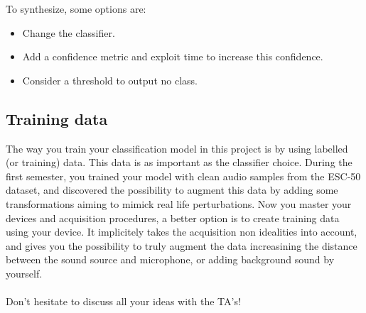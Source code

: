 To synthesize, some options are:
\begin{itemize}
    \item Change the classifier.
    \item Add a confidence metric and exploit time to increase this confidence.
    \item Consider a threshold to output no class.
\end{itemize}

\subsection{Training data}

The way you train your classification model in this project is by using labelled (or training) data. This data is as important as the classifier choice. During the first semester, you trained your model with clean audio samples from the ESC-50 dataset, and discovered the possibility to augment this data by adding some transformations aiming to mimick real life perturbations. Now you master your devices and acquisition procedures, a better option is to create training data using your device. It implicitely takes the acquisition non idealities into account, and gives you the possibility to truly augment the data increasining the distance between the sound source and microphone, or adding background sound by yourself. \\
\\
Don't hesitate to discuss all your ideas with the TA's!
